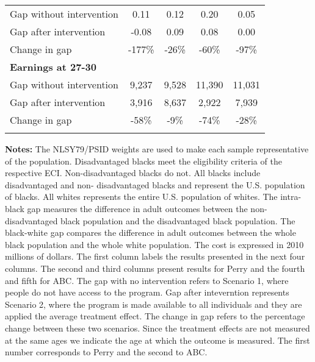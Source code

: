\begin{table}[htbp]
\begin{center}
\begin{tabular}{lcccc}
 Gap without intervention &        0.11&        0.12&        0.20&        0.05 \\[0.02cm]   Gap after intervention &       -0.08&        0.09&        0.08&        0.00 \\[0.02cm]   Change in gap &        -177\%&         -26\%&         -60\%&         -97\% \\[0.1cm]  \textbf{ Earnings at 27-30} &&&& \\[0.02cm]  
 Gap without intervention &       9,237&       9,528&      11,390&      11,031 \\[0.02cm]   Gap after intervention &       3,916&       8,637&       2,922&       7,939 \\[0.02cm]   Change in gap &         -58\%&          -9\%&         -74\%&         -28\% \\[0.1cm]   \\[0.2cm]  \hline 
 \hline \end{tabular}
 \end{center} 
       {\scriptsize  
       {\raggedright 
{\bfseries Notes:} The NLSY79/PSID weights are used to make each sample representative of the population. Disadvantaged blacks meet the  eligibility criteria of the respective ECI. Non-disadvantaged blacks do  not. All blacks include disadvantaged and non- disadvantaged blacks and represent the U.S. population of blacks. All  whites represents the entire U.S. population of whites. The intra- black gap measures the difference in adult outcomes between the non- disadvantaged black population and the disadvantaged black population.  The black-white gap compares the difference in adult outcomes between the  whole black population and the whole white population. The cost is expressed in 2010 millions of dollars. The first column labels the results presented in the next four columns. The second and third columns present results for Perry and the fourth and fifth for ABC. The gap with no intervention refers to Scenario 1, where people do not have access to the program. Gap after inteverntion represents Scenario 2, where the program is made available to all individuals and they are applied the average treatment effect. The change in gap refers to the  percentage change between these two scenarios. Since the treatment effects are not measured at the same ages we indicate the age at which the outcome is measured. The first number corresponds to Perry and the second to ABC.} } 
 \end{table}
